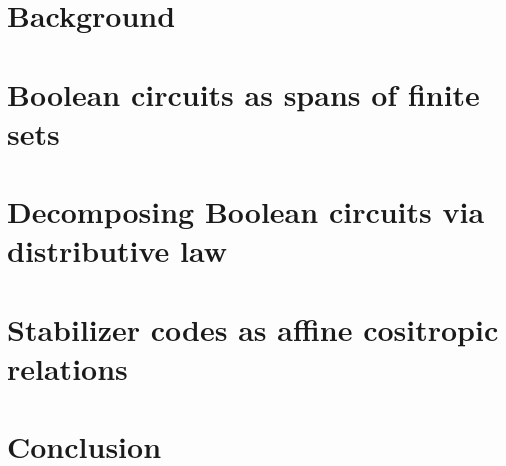 \documentclass[12pt]{ociamthesis}  %
\begin{document}
\chapter{Background}


\chapter{Boolean circuits as spans of finite sets}


\chapter{Decomposing Boolean circuits via distributive law}


\chapter{Stabilizer codes as affine cositropic relations}


%

\chapter{Conclusion}


 

\end{document}
